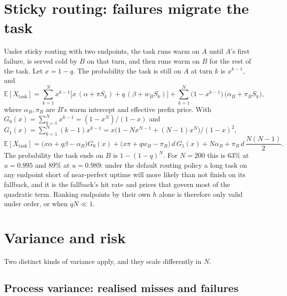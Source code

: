 \documentclass[11pt]{article}
\newcommand{\E}{\mathbb{E}}
\begin{document}
\section{Sticky routing: failures migrate the task}\label{sec:sticky}

Under \textsf{sticky} routing with two endpoints, the task runs warm on $A$
until $A$'s first failure, is served cold by $B$ on that turn, and then runs
warm on $B$ for the rest of the task. Let $x = 1 - q$. The probability the
task is still on $A$ at turn $k$ is $x^{k-1}$, and
\begin{equation}\label{eq:sticky}
  \E[X_{\text{task}}]
  = \sum_{k=1}^{N} x^{k-1}\Big[ x\,(\alpha + \pi S_k) + q\,(\beta + w_B S_k) \Big]
  + \sum_{k=1}^{N} \big(1 - x^{k-1}\big)\,\big(\alpha_B + \pi_B S_k\big),
\end{equation}
where $\alpha_B, \pi_B$ are $B$'s warm intercept and effective prefix price.
With $G_0(x) = \sum_{k=1}^{N} x^{k-1} = (1-x^N)/(1-x)$ and
$G_1(x) = \sum_{k=1}^{N} (k-1)x^{k-1} = x\big(1 - N x^{N-1} + (N-1)x^N\big)/(1-x)^2$,
\[
  \E[X_{\text{task}}]
  = \big(x\alpha + q\beta - \alpha_B\big) G_0(x)
  + \big(x\pi + q w_B - \pi_B\big)\, d\, G_1(x)
  + N \alpha_B + \pi_B\, d\, \frac{N(N-1)}{2}.
\]
The probability the task ends on $B$ is $1 - (1-q)^{N}$. For $N = 200$ this is
63\% at $u = 0.995$ and 89\% at $u = 0.989$: under the default routing policy
a long task on any endpoint short of near-perfect uptime will more likely than
not finish on its fallback, and it is the fallback's hit rate and prices that
govern most of the quadratic term. Ranking endpoints by their own $h$ alone is
therefore only valid under \textsf{order}, or when $qN \ll 1$.

\section{Variance and risk}\label{sec:var}

Two distinct kinds of variance apply, and they scale differently in $N$.

\subsection{Process variance: realised misses and failures}
\end{document}
